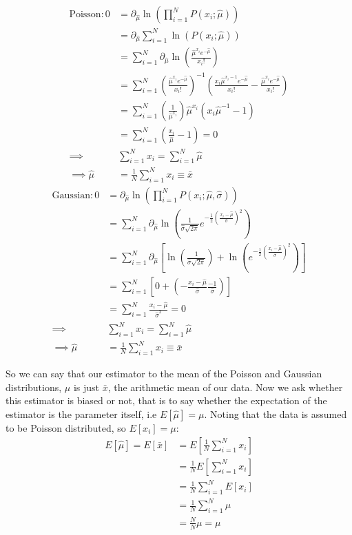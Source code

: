 \documentclass[12pt]{article}
\numberwithin{equation}{section}
\numberwithin{figure}{section}
\numberwithin{table}{section}
\begin{document}
\begin{align*}
    \text{Poisson:}\,0&=\partial_{\hat\mu}\ln(\prod_{i=1}^N P(x_i;\hat\mu))\\
    &=\partial_{\hat\mu}\sum_{i=1}^N \ln(P(x_i;\hat\mu))\\
    &=\sum_{i=1}^N \partial_{\hat\mu} \ln(\frac{\hat\mu^{x_i}e^{-\hat\mu}}{x_i!})\\
    &=\sum_{i=1}^N \left(\frac{\hat\mu^{x_i}e^{-\hat\mu}}{x_i!}\right)^{-1}\left(\frac{x_i\hat\mu^{x_i-1}e^{-\hat\mu}}{x_i!}-\frac{\hat\mu^{x_i}e^{-\hat\mu}}{x_i!}\right)\\
    &=\sum_{i=1}^N \left(\frac{1}{\hat\mu^{x_i}}\right)\hat\mu^{x_i}\left(x_i\hat\mu^{-1}-1\right)\\
    &=\sum_{i=1}^N \left(\frac{x_i}{\hat\mu}-1\right)=0\\
    \implies &\sum_{i=1}^N x_i = \sum_{i=1}^N \hat\mu \\
    \implies \hat\mu &= \frac{1}{N}\sum_{i=1}^N x_i \equiv \bar{x}
\end{align*}
\begin{align*}
    \text{Gaussian:}\,0&=\partial_{\hat\mu}\ln(\prod_{i=1}^N P(x_i;\hat\mu,\hat\sigma))\\
    &=\sum_{i=1}^N \partial_{\hat\mu} \ln(\frac{1}{\hat\sigma \sqrt{2\pi}}e^{-\frac{1}{2}\left(\frac{x_i-\hat\mu}{\hat\sigma}\right)^2})\\
    &=\sum_{i=1}^N \partial_{\hat\mu}\left[ \ln(\frac{1}{\hat\sigma \sqrt{2\pi}})+\ln(e^{-\frac{1}{2}\left(\frac{x_i-\hat\mu}{\hat\sigma}\right)^2})\right]\\
    &=\sum_{i=1}^N \left[0+\left(-\frac{x_i-\hat\mu}{\hat\sigma}\frac{-1}{\hat\sigma}\right)\right]\\
    &=\sum_{i=1}^N \frac{x_i-\hat\mu}{\hat\sigma^2}=0\\
    \implies & \sum_{i=1}^N x_i = \sum_{i=1}^N \hat\mu\\
    \implies \hat\mu &= \frac{1}{N}\sum_{i=1}^N x_i \equiv \bar{x}
\end{align*}
\par So we can say that our estimator to the mean of the Poisson and Gaussian distributions, $\hat\mu$ is just $\bar{x}$, the arithmetic mean of our data. Now we ask whether this estimator is biased or not, that is to say whether the expectation of the estimator is the parameter itself, i.e $E[\hat\mu]=\mu$. Noting that the data is assumed to be Poisson distributed, so $E[x_i]=\mu$:
\begin{align*}
        E[\hat\mu]=E[\bar{x}]&=E[\frac{1}{N}\sum_{i=1}^N x_i]\\
        &=\frac{1}{N}E[\sum_{i=1}^N x_i]\\
        &=\frac{1}{N}\sum_{i=1}^N E[x_i]\\
        &=\frac{1}{N}\sum_{i=1}^N \mu\\
        &=\frac{N}{N} \mu=\mu
\end{align*}
\end{document}
